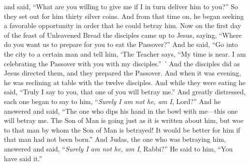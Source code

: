 \begin{biblechapter}
\verse and said, “What are you willing to give me if I in turn deliver him to you?” So they set out for him thirty silver coins.
\verse And from that time on, he began seeking a favorable opportunity in order that he could betray him.
 Now on the first day of the feast of Unleavened Bread the disciples came up to Jesus, saying, “Where do you want us to prepare for you to eat the Passover?”
\verse And he said, “Go into the city to a certain man and tell him, ‘The Teacher says, “My time is near. I am celebrating the Passover with you with my disciples.” ’
\verse And the disciples did as Jesus directed them, and they prepared the Passover.
\verse And when it was evening, he was reclining at table with the twelve disciples.
\verse And while they were eating he said, “Truly I say to you, that one of you will betray me.”
\verse And greatly distressed, each one began to say to him, “\textit{Surely I am not he, am I}, Lord?”
\verse And he answered and said, “The one who dips his hand in the bowl with me—this one will betray me.
\verse The Son of Man is going just as it is written about him, but woe to that man by whom the Son of Man is betrayed! It would be better for him if that man had not been born.”
\verse And Judas, the one who was betraying him, answered and said, “\textit{Surely I am not he, am I}, Rabbi?” He said to him, “You have said it.”

\end{biblechapter}
